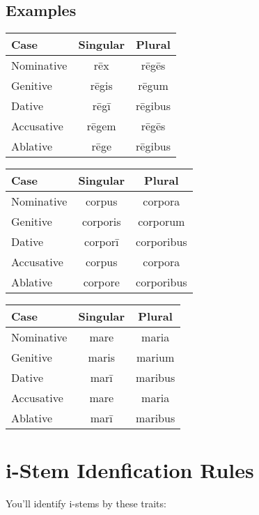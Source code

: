 \subsection*{Examples}
{\centering
\begin{tabular}{|l|c|c|}
\hline
\textbf{Case} & \textbf{Singular} & \textbf{Plural} \\
  \hline
  Nominative & rēx & rēgēs \\
  Genitive   & rēgis & rēgum \\
  Dative     & rēgī & rēgibus \\
  Accusative & rēgem & rēgēs \\
  Ablative   & rēge & rēgibus \\
  \hline
\end{tabular}
\hspace{2mm}
\begin{tabular}{|l|c|c|}
  \hline
  \textbf{Case} & \textbf{Singular} & \textbf{Plural} \\
  \hline
  Nominative & corpus & corpora \\
  Genitive   & corporis & corporum \\
  Dative     & corporī & corporibus \\
  Accusative & corpus & corpora \\
  Ablative   & corpore & corporibus \\
  \hline
\end{tabular}
\newline
\vspace*{8mm}
\newline
\begin{tabular}{|l|c|c|}
  \hline
  \textbf{Case} & \textbf{Singular} & \textbf{Plural} \\
  \hline
  Nominative & mare & maria \\
  Genitive   & maris & marium \\
  Dative     & marī & maribus \\
  Accusative & mare & maria \\
  Ablative   & marī & maribus \\
  \hline
\end{tabular}}
\section*{i-Stem Idenfication Rules}
You’ll identify i-stems by these traits:
